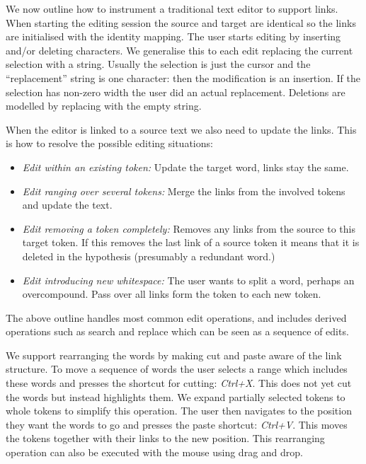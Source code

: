 \documentclass[10pt, a4paper]{article}
\begin{document}
We now outline how to instrument a traditional text editor to support links.
When starting the editing session the source and target are identical so the
links are initialised with the identity mapping. The user starts editing
by inserting and/or deleting characters.
We generalise this to each edit replacing the current selection with a
string. Usually the selection is just the cursor and the ``replacement'' string
is one character: then the modification is an insertion.
If the selection has non-zero width the user did an actual replacement.
Deletions are modelled by replacing with the empty string.

When the editor is linked to a source text we also need to update the links.
This is how to resolve the possible editing situations:

\begin{itemize}

\item {\it Edit within an existing token:}
Update the target word, links stay the same.

\item {\it Edit ranging over several tokens:}
Merge the links from the involved tokens and update the text.

\item {\it Edit removing a token completely:}
Removes any links from the source to this target token.
If this removes the last link of a source token it means that
it is deleted in the hypothesis (presumably a redundant word.)

\item {\it Edit introducing new whitespace:}
The user wants to split a word, perhaps an overcompound.
Pass over all links form the token to each new token.

\end{itemize}

The above outline handles most common edit operations, and includes derived
operations such as search and replace which can be seen as a sequence of edits.

We support rearranging the words by making cut and paste aware of the link
structure. To move a sequence of words the user selects a range
which includes these words and presses the shortcut for cutting: {\it Ctrl+X}.
This does not yet cut the words but instead highlights them. We expand partially
selected tokens to whole tokens to simplify this operation. The user then
navigates to the position they want the words to go and presses the paste
shortcut: {\it Ctrl+V}.
This moves the tokens together with their links to the new position.
This rearranging operation can also be executed with the mouse using drag and drop.
\end{document}
